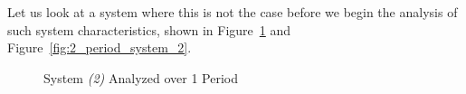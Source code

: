 Let us look at a system where this is not the case before we begin the
analysis of such system characteristics, shown in
Figure~\ref{fig:1_period_system_2} and Figure~\ref{fig:2_period_system_2}.

\begin{figure}[ht!]
  \centering
  \caption{System \emph{(2)} Analyzed over 1 Period}
  \label{fig:1_period_system_2}
\end{figure}

